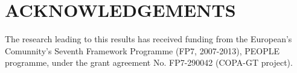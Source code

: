 \section{ACKNOWLEDGEMENTS}

The research leading to this results has received funding from the European's Comunnity's Seventh Framework Programme (FP7, 2007-2013), PEOPLE programme, under the grant agreement No. FP7-290042 (COPA-GT project).